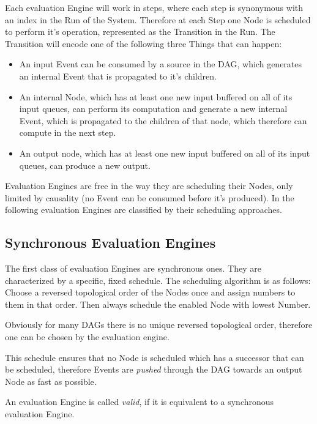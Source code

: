 Each evaluation Engine will work in steps, where each step is synonymous with an index in the Run of the System.
Therefore at each Step one Node is scheduled to perform it's operation, represented as the Transition in the Run.
The Transition will encode one of the following three Things that can happen:

\begin{itemize}
  \item An input Event can be consumed by a source in the DAG, which generates an internal Event that is propagated to it's children.
  \item An internal Node, which has at least one new input buffered on all of its input queues, can perform
    its computation and generate a new internal Event, which is propagated to the children of that node, which therefore can compute in the next step.
  \item An output node, which has at least one new input buffered on all of its input queues, can produce a new output.
\end{itemize}

Evaluation Engines are free in the way they are scheduling their Nodes, only limited by causality (no Event can be consumed before it's produced).
In the following evaluation Engines are classified by their scheduling approaches.

\subsection{Synchronous Evaluation Engines}
\label{sec:concepts:behaviour_without_timing:synchronous}

The first class of evaluation Engines are synchronous ones.
They are characterized by a specific, fixed schedule.
The scheduling algorithm is as follows: Choose a reversed topological order of the Nodes once and assign numbers to them in that order.
Then always schedule the enabled Node with lowest Number.

Obviously for many DAGs there is no unique reversed topological order, therefore one can be chosen by the evaluation engine.

This schedule ensures that no Node is scheduled which has a successor that can be scheduled, therefore Events are \emph{pushed} through the DAG towards an output Node as fast as possible.

\begin{definition}[name = Valid evaluation Engines]\label{def:valid_eval_engine}
  An evaluation Engine is called \emph{valid}, if it is equivalent to a synchronous evaluation Engine.
\end{definition}

